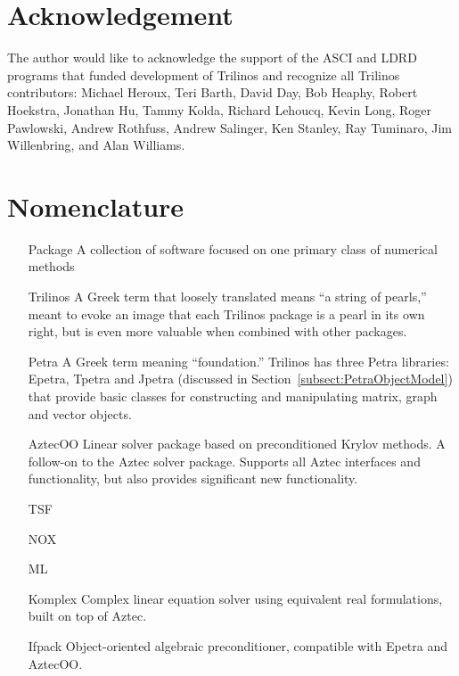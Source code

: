 \documentclass[12pt,relax]{SANDreport}
\begin{document}
    \section*{Acknowledgement}
The author would like to acknowledge the support of the ASCI and LDRD 
programs that funded development of Trilinos and recognize all Trilinos 
contributors: Michael Heroux, Teri Barth, David Day, Bob Heaphy, 
Robert Hoekstra, Jonathan Hu, Tammy Kolda, Richard Lehoucq, Kevin Long, 
Roger Pawlowski, Andrew Rothfuss, Andrew Salinger, Ken Stanley, Ray 
Tuminaro, Jim Willenbring, and Alan Williams.

    \clearpage
    \tableofcontents
    \listoffigures
    \listoftables

    \clearpage
    \section*{Nomenclature}
    \begin{itemize}
	\item[Package]
	    A collection of software focused on one primary class of numerical methods
	\item[Trilinos]
	    A Greek term that loosely translated means ``a string of pearls,'' meant
         to evoke an image that each Trilinos package is a pearl in its own right,
         but is even more valuable when combined with other packages.
	\item[Petra]
	    A Greek term meaning ``foundation.''  Trilinos has three Petra libraries: Epetra, 
	    Tpetra and Jpetra (discussed in Section~\ref{subsect:PetraObjectModel}) that
	    provide basic classes for constructing and manipulating matrix, graph and vector 
	    objects.
        \item[AztecOO] Linear solver package based on preconditioned Krylov methods.  A
	  follow-on to the Aztec solver package.  Supports all Aztec interfaces and
	  functionality, but also provides significant new functionality.
	\item[TSF]
	\item[NOX]
	\item[ML]
	\item[Komplex] Complex linear equation solver using equivalent real formulations,
	  built on top of Aztec.
	\item[Ifpack] Object-oriented algebraic preconditioner, compatible with Epetra and
	  AztecOO.
    \end{itemize}
\end{document}
